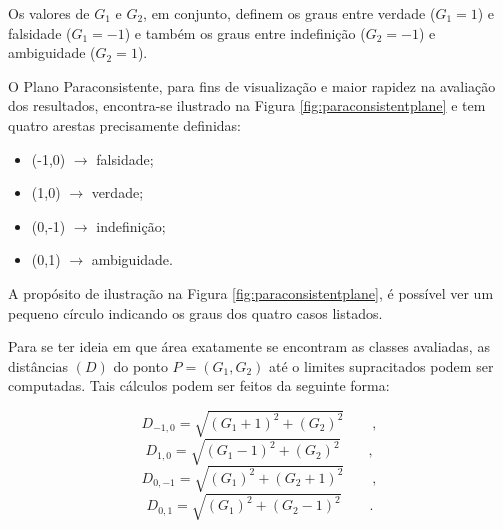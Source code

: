 			\par Os valores de $G_1$ e $G_2$, em conjunto, definem os graus entre verdade ($G_1=1$) e falsidade ($G_1=-1$) e também os graus entre indefinição ($G_2=-1$) e ambiguidade ($G_2=1$).
		
			\par O Plano Paraconsistente, para fins de visualização e maior rapidez na avaliação dos resultados, encontra-se ilustrado na Figura \ref{fig:paraconsistentplane} e tem quatro arestas precisamente definidas:
			\begin{itemize}
				\item (-1,0) $\rightarrow$ falsidade;
				\item (1,0) $\rightarrow$ verdade;
				\item (0,-1) $\rightarrow$ indefinição;
				\item (0,1) $\rightarrow$ ambiguidade.
			\end{itemize}
			\par A propósito de ilustração na Figura \ref{fig:paraconsistentplane}, é possível ver um pequeno círculo indicando os graus dos quatro casos listados.
	
			\par Para se ter ideia em que área exatamente se encontram as classes avaliadas, as distâncias $(D)$ do ponto $P=(G_1,G_2)$ até o limites supracitados podem ser computadas. Tais cálculos podem ser feitos da seguinte forma:

			\begin{equation}
				D_{-1,0}=\sqrt{(G_1+1)^2+(G_2)^2}\qquad,
			\end{equation}
			\begin{equation}
				D_{1,0}=\sqrt{(G_1-1)^2+(G_2)^2}\qquad,
			\end{equation}
			\begin{equation}
				D_{0,-1}=\sqrt{(G_1)^2+(G_2+1)^2}\qquad,		
			\end{equation}
			\begin{equation}
				D_{0,1}=\sqrt{(G_1)^2+(G_2-1)^2}\qquad.
			\end{equation}		

